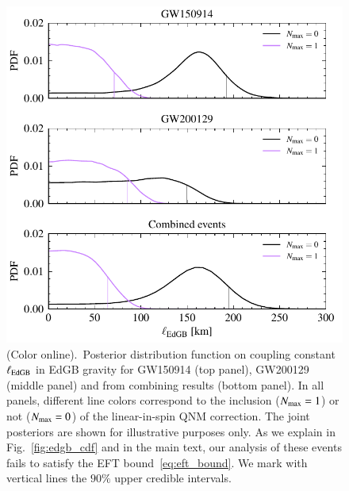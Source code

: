 \documentclass[twocolumn,
               prd,
               aps,
               superscriptaddress,
               tightenlines,
               nofootinbib,
               eqsecnum,
               amsfonts,
               amsmath,
               longbibliography]{revtex4-1}
\begin{document}
\begin{figure}[h]
\includegraphics[width=\columnwidth]{figs/edgb_posteriors_combined.pdf}
\caption{(Color online).~Posterior distribution function on coupling constant $\ell_{\rm EdGB}$ in EdGB gravity
for GW150914 (top panel), GW200129 (middle panel)
and from combining results (bottom panel).
%
In all panels, different line colors correspond to the inclusion ($N_{\rm max} = 1$) or not ($N_{\rm max} = 0$)
of the linear-in-spin QNM correction.
%
The joint posteriors are shown for illustrative purposes only. As we explain in Fig.~\ref{fig:edgb_cdf} and
in the main text, our analysis of these events fails to satisfy the EFT bound~\eqref{eq:eft_bound}. We mark
with vertical lines the $90\%$ upper credible intervals.}
\label{fig:edgb_exec_sum}
\end{figure}
\end{document}
